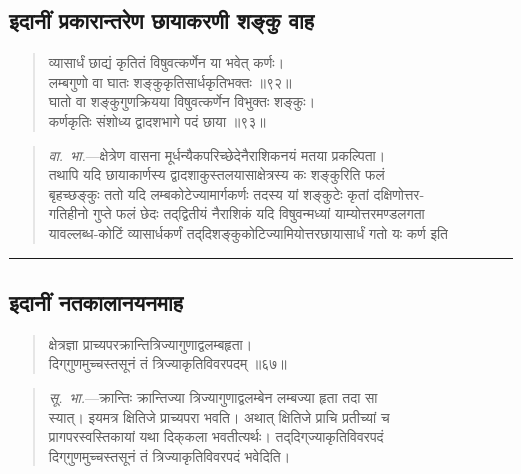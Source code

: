 \documentclass[11pt,a4paper]{article}
\newcommand{\longline}{\noindent\rule{\textwidth}{0.4pt}}
\newcommand{\dev}[1]{{\devanagarifont #1}}
\newenvironment{shloka}{%
  \begin{quote}
  \small
  \setlength{\leftmargin}{2em}
  \devanagarifont
}{\end{quote}}
\newenvironment{vyakhya}{%
  \begin{quote}
  \small
  \setlength{\leftmargin}{1em}
  \devanagarifont
}{\end{quote}}
\newcommand{\skt}[1]{{\devanagarifont #1}}
\begin{document}
\subsection{\dev{इदानीं प्रकारान्तरेण छायाकरणी शङ्कु वाह}}

\begin{shloka}
\skt{व्यासार्धं छाद्यं कृतितं विषुवत्कर्णेन या भवेत् कर्णः।}\\
\skt{लम्बगुणो वा घातः शङ्कुकृतिसार्धकृतिभक्तः ॥९२॥}\\[0.3em]
\skt{घातो वा शङ्कुगुणक्रियया विषुवत्कर्णेन विभुक्तः शङ्कुः।}\\
\skt{कर्णकृतिः संशोध्य द्वादशभागे पदं छाया ॥९३॥}
\end{shloka}

\begin{vyakhya}
\textit{वा.\ भा.}—\skt{क्षेत्रेण वासना मूर्धन्यैकपरिच्छेदेनैराशिकनयं मतया प्रकल्पिता।}\\
\skt{तथापि यदि छायाकार्णस्य द्वादशाकुस्तलयासाक्षेत्रस्य कः शङ्कुरिति फलं}\\
\skt{बृहच्छङ्कुः ततो यदि लम्बकोटेज्यामार्गकर्णः तदस्य यां शङ्कुटेः कृतां दक्षिणोत्तर-}\\
\skt{गतिहीनो गुप्ते फलं छेदः तद्‌द्वितीयं नैराशिकं यदि विषुवन्मध्यां याम्योत्तरमण्डलगता}\\
\skt{यावल्लब्ध-कोटिं व्यासार्धकर्णं तद्‌दिशङ्कुकोटिज्यामियोत्तरछायासार्धं गतो यः कर्ण इति}
\end{vyakhya}

\longline

\subsection{\dev{इदानीं नतकालानयनमाह}}

\begin{shloka}
\skt{क्षेत्रज्ञा प्राच्यपरक्रान्तित्रिज्यागुणाद्वलम्बहृता।}\\
\skt{दिग्‌गुणमुच्चस्तसूनं तं त्रिज्याकृतिविवरपदम् ॥६७॥}
\end{shloka}

\begin{vyakhya}
\textit{सू.\ भा.}—\skt{क्रान्तिः क्रान्तिज्या त्रिज्यागुणाद्वलम्बेन लम्बज्या हृता तदा सा}\\
\skt{स्यात्। इयमत्र क्षितिजे प्राच्यपरा भवति। अथात् क्षितिजे प्राचि प्रतीच्यां च}\\
\skt{प्रागपरस्वस्तिकायां यथा दिक्‌कला भवतीत्यर्थः। तद्‌दिग्‌ज्याकृतिविवरपदं}\\
\skt{दिग्‌गुणमुच्चस्तसूनं तं त्रिज्याकृतिविवरपदं भवेदिति।}
\end{vyakhya}
\end{document}
